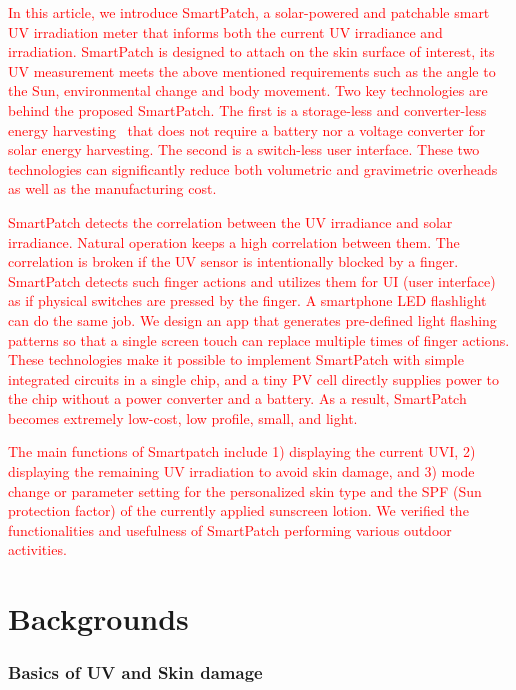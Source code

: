 \documentclass[journal]{IEEEtran}
\begin{document}
\textcolor{red}{In this article, we introduce SmartPatch, a solar-powered and patchable smart UV irradiation meter that informs both the current UV irradiance and irradiation. SmartPatch is designed to attach on the skin surface of interest, its UV measurement meets the above mentioned requirements such as the angle to the Sun, environmental change and body movement. Two key technologies are behind the proposed SmartPatch. The first is a storage-less and converter-less energy harvesting~\cite{Lee:ASPDAC15} that does not require a battery nor a voltage converter for solar energy harvesting. The second is a switch-less user interface. These two technologies can significantly reduce both volumetric and gravimetric overheads as well as the manufacturing cost.}

\textcolor{red}{SmartPatch detects the correlation between the UV irradiance and solar irradiance. Natural operation keeps a high correlation between them. The correlation is broken if the UV sensor is intentionally blocked by a finger. SmartPatch detects such finger actions and utilizes them for UI (user interface) as if physical switches are pressed by the finger. A smartphone LED flashlight can do the same job. We design an app that  generates pre-defined light flashing patterns so that a single screen touch can replace multiple times of finger actions. These technologies make it possible to implement SmartPatch with simple integrated circuits in a single chip, and a tiny PV cell directly supplies power to the chip without a power converter and a battery. As a result, SmartPatch becomes extremely low-cost, low profile, small, and light.}

 \textcolor{red}{The main functions of Smartpatch include 1) displaying the current UVI, 2) displaying the remaining UV irradiation to avoid skin damage, and 3) mode change or parameter setting for the personalized skin type and the SPF (Sun protection factor) of the currently applied sunscreen lotion. We verified the functionalities and usefulness of SmartPatch performing various outdoor activities.}

\section{Backgrounds}
\subsubsection{Basics of UV and Skin damage}
\end{document}
